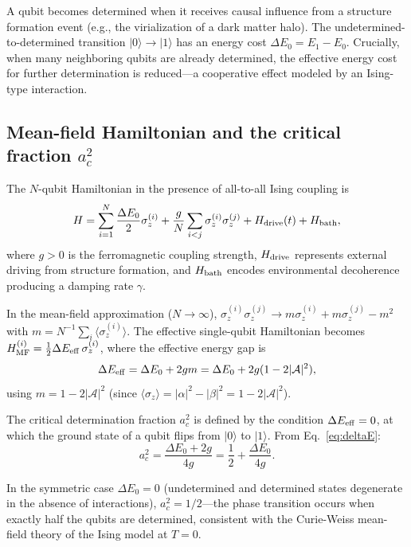 \documentclass[aps,prd,twocolumn,superscriptaddress]{revtex4-2}
\begin{document}
A qubit becomes determined when it receives causal influence from a structure formation event (e.g., the virialization of a dark matter halo). The undetermined-to-determined transition $|0\rangle \to |1\rangle$ has an energy cost $\Delta E_0 = E_1 - E_0$. Crucially, when many neighboring qubits are already determined, the effective energy cost for further determination is reduced---a cooperative effect modeled by an Ising-type interaction.

\subsection{Mean-field Hamiltonian and the critical fraction $a_c^2$}

The $N$-qubit Hamiltonian in the presence of all-to-all Ising coupling is
\begin{equation}
H = \sum_{i=1}^{N} \frac{\Delta E_0}{2}\sigma_z^{(i)} + \frac{g}{N}\sum_{i<j}\sigma_z^{(i)}\sigma_z^{(j)} + H_{\rm drive}(t) + H_{\rm bath},
\label{eq:hamiltonian}
\end{equation}
where $g > 0$ is the ferromagnetic coupling strength, $H_{\rm drive}$ represents external driving from structure formation, and $H_{\rm bath}$ encodes environmental decoherence producing a damping rate $\gamma$.

In the mean-field approximation ($N \to \infty$), $\sigma_z^{(i)}\sigma_z^{(j)} \to m\sigma_z^{(i)} + m\sigma_z^{(j)} - m^2$ with $m = N^{-1}\sum_i\langle\sigma_z^{(i)}\rangle$. The effective single-qubit Hamiltonian becomes $H_{\rm MF}^{(i)} = \frac{1}{2}\Delta E_{\rm eff}\,\sigma_z^{(i)}$, where the effective energy gap is
\begin{equation}
\Delta E_{\rm eff} = \Delta E_0 + 2g m = \Delta E_0 + 2g(1-2|\mathcal{A}|^2),
\label{eq:deltaE}
\end{equation}
using $m = 1 - 2|\mathcal{A}|^2$ (since $\langle\sigma_z\rangle = |\alpha|^2 - |\beta|^2 = 1-2|\mathcal{A}|^2$).

The critical determination fraction $a_c^2$ is defined by the condition $\Delta E_{\rm eff}=0$, at which the ground state of a qubit flips from $|0\rangle$ to $|1\rangle$. From Eq.~\eqref{eq:deltaE}:
\begin{equation}
a_c^2 = \frac{\Delta E_0 + 2g}{4g} = \frac{1}{2} + \frac{\Delta E_0}{4g}.
\label{eq:ac2_equilibrium}
\end{equation}

In the symmetric case $\Delta E_0 = 0$ (undetermined and determined states degenerate in the absence of interactions), $a_c^2 = 1/2$---the phase transition occurs when exactly half the qubits are determined, consistent with the Curie-Weiss mean-field theory of the Ising model at $T=0$.
\end{document}
